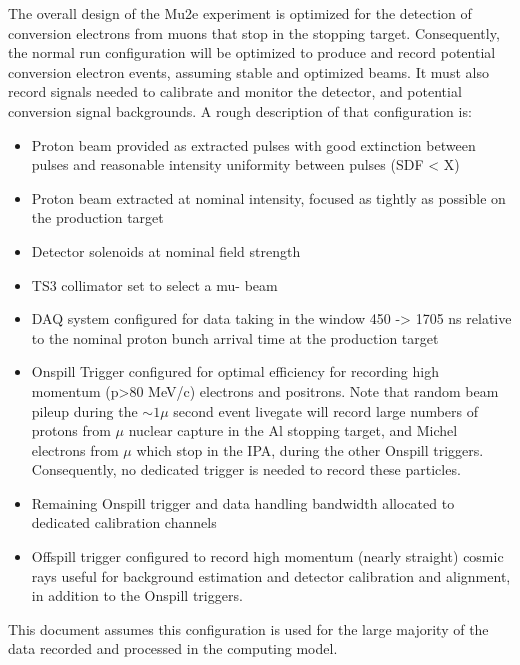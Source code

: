 The overall design of the Mu2e experiment is optimized for the detection of conversion electrons from muons that stop in the stopping target.  Consequently, the normal run configuration will be optimized to produce and record potential conversion electron events, assuming stable and optimized beams.  It must also record signals needed to calibrate and monitor the detector, and potential conversion signal backgrounds.  
A rough description of that configuration is:
\begin{itemize}
  \item Proton beam provided as extracted pulses with good extinction between pulses and reasonable intensity uniformity between pulses (SDF < X)
  \item Proton beam extracted at nominal intensity, focused as tightly as possible on the production target
  \item Detector solenoids at nominal field strength
  \item TS3 collimator set to select a mu- beam
  \item DAQ system configured for data taking in the window 450 -> 1705 ns relative to the nominal proton bunch arrival time at the production target
  \item Onspill Trigger configured for optimal efficiency for recording high momentum (p>80 MeV/c) electrons and positrons.  Note that random beam pileup during the $\sim 1 \mu$ second event livegate will record large numbers of protons from $\mu$ nuclear capture in the Al stopping target, and Michel electrons from $\mu$ which stop in the IPA, during the other Onspill triggers.  Consequently, no dedicated trigger is needed to record these particles. 
  \item Remaining Onspill trigger and data handling bandwidth allocated to dedicated calibration channels
  \item Offspill trigger configured to record high momentum (nearly straight) cosmic rays useful for background estimation and detector calibration and alignment, in addition to the Onspill triggers.
\end{itemize}
This document assumes this configuration is used for the large majority of the data recorded and processed in the computing model.

